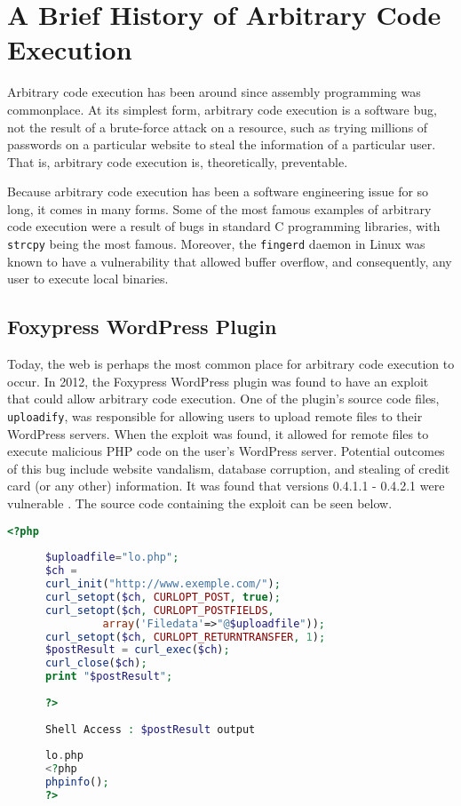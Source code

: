 \section{A Brief History of Arbitrary Code Execution}

Arbitrary code execution has been around since assembly programming was commonplace. At its simplest form, arbitrary code execution is a software bug, not the result of a brute-force attack on a resource, such as trying millions of passwords on a particular website to steal the information of a particular user. That is, arbitrary code execution is, theoretically, preventable.

Because arbitrary code execution has been a software engineering issue for so long, it comes in many forms. Some of the most famous examples of arbitrary code execution were a result of bugs in standard C programming libraries, with \texttt{strcpy} being the most famous. Moreover, the \texttt{fingerd} daemon in Linux was known to have a vulnerability that allowed buffer overflow, and consequently, any user to execute local binaries.

\subsection{Foxypress WordPress Plugin}

Today, the web is perhaps the most common place for arbitrary code execution to occur. In 2012, the Foxypress WordPress plugin was found to have an exploit that could allow arbitrary code execution. One of the plugin’s source code files, \texttt{uploadify}, was responsible for allowing users to upload remote files to their WordPress servers. When the exploit was found, it allowed for remote files to execute malicious PHP code on the user’s WordPress server. Potential outcomes of this bug include website vandalism, database corruption, and stealing of credit card (or any other) information. It was found that versions 0.4.1.1 - 0.4.2.1 were vulnerable \cite{foxypress_2012}. The source code containing the exploit can be seen below.

\begin{lstlisting}[language=PHP]
      <?php
       
      $uploadfile="lo.php";
      $ch = 
      curl_init("http://www.exemple.com/");
      curl_setopt($ch, CURLOPT_POST, true);
      curl_setopt($ch, CURLOPT_POSTFIELDS,
               array('Filedata'=>"@$uploadfile"));
      curl_setopt($ch, CURLOPT_RETURNTRANSFER, 1);
      $postResult = curl_exec($ch);
      curl_close($ch);
      print "$postResult";
       
      ?>
       
      Shell Access : $postResult output
       
      lo.php
      <?php
      phpinfo();
      ?>
\end{lstlisting}

